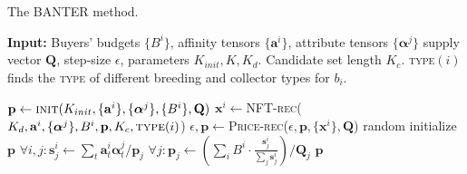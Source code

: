 \documentclass[conference]{IEEEtran}
\newcommand{\1}[1]{\mathds{1}\left[#1\right]}
\theoremstyle{plain}
\newcommand{\method}{\textsf{BANTER}\xspace}
\newcommand{\finddemand}{\textsc{NFT-rec}\xspace}
\newcommand{\findprice}{\textsc{Price-rec}\xspace}
\begin{document}
\begin{algorithm}[t]
    \small
    \caption{The \method method.}
    \label{alg:method}
    \textbf{Input:} Buyers' budgets $\{B^i\}$, affinity tensors $\{\mathbf{a}^i\}$, attribute tensors $\{\bm{\alpha}^j\}$ supply vector $\mathbf{Q}$, step-size $\epsilon$, parameters $K_{init}, K, K_d$. Candidate set length $K_c$. \textsc{type}$(i)$ finds the \textsc{type} of different breeding and collector types for $b_i$.
    \begin{algorithmic}[1]
    \State $\mathbf{p}\gets \textsc{init}(K_{init}, \{\mathbf{a}^i\}, \{\bm{\alpha}^j\}, \{B^i\}, \mathbf{Q})$
            \State $\mathbf{x}^i\gets$\finddemand($K_{d}, \mathbf{a}^i, \{\bm{\alpha}^j\}, B^i, \mathbf{p}, K_c, \textsc{type}(i)$)
        \EndFor
        \State $\epsilon, \mathbf{p} \gets$\findprice($\epsilon, \mathbf{p}, \{\mathbf{x}^i\}, \mathbf{Q}$)
    \EndFor
        \State random initialize $\mathbf{p}$
            \State $\forall i, j: \mathbf{s}^i_j \gets \sum_t\mathbf{a}^i_t\bm{\alpha}^j_t/\mathbf{p}_j$
            \State 
            $\forall j: \mathbf{p}_j\gets \left(\sum_i B^i\cdot \frac{\mathbf{s}^i_j}{\sum_j \mathbf{s}^i_j}\right)/\mathbf{Q}_j$
        \EndFor
        \Return $\mathbf{p}$
    \EndProcedure
    \end{algorithmic}
\end{algorithm}
\end{document}
